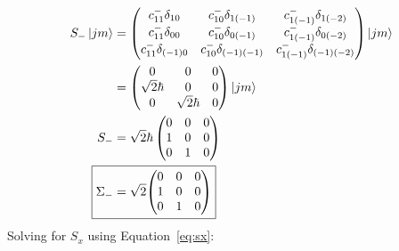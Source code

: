 \documentclass{jhwhw}
\begin{document}
\begin{align}
    S_{-}\ket{j m}
    &=
    \begin{pmatrix}
        c_{11}^- \delta_{10}    &   c_{10}^- \delta_{1(-1)}    &   c_{1(-1)}^- \delta_{1(-2)}    \\
        c_{11}^- \delta_{00}    &   c_{10}^- \delta_{0(-1)}    &   c_{1(-1)}^- \delta_{0(-2)}    \\
        c_{11}^- \delta_{(-1)0}    &   c_{10}^- \delta_{(-1)(-1)}    &   c_{1(-1)}^- \delta_{(-1)(-2)}
    \end{pmatrix}
    \ket{j m}
    \\
    &=
    \begin{pmatrix}
        0   &   0   &   0   \\
        \sqrt{2}\hbar   &   0   &   0   \\
        0   &   \sqrt{2}\hbar   &   0   
    \end{pmatrix}
    \ket{j m}
    \\
    S_{-}
    &=
    \sqrt{2}\hbar
    \begin{pmatrix}
        0   &   0   &   0   \\
        1   &   0   &   0   \\
        0   &   1   &   0   
    \end{pmatrix}
    \\
    \Aboxed{
    \Sigma_-
    &=
    \sqrt{2}
    {\begin{pmatrix}
        0   &   0   &   0   \\
        1   &   0   &   0   \\
        0   &   1   &   0   
    \end{pmatrix}}
    }
\end{align}
Solving for $S_x$ using Equation~\eqref{eq:sx}:
\end{document}
